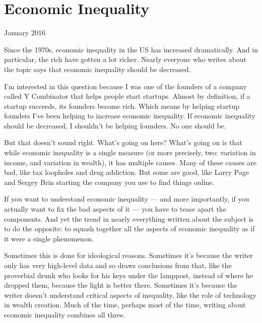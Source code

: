 \chapter{Economic Inequality}


            
              
                


                  January 2016

Since the 1970s, economic inequality
                  in the US has increased dramatically. And in particular, the
                  rich have gotten a lot richer. Nearly everyone who writes
                  about the topic says that economic inequality should be
                  decreased.

I'm interested in this question because
                  I was one of the founders of a company called Y Combinator
                  that helps people start startups. Almost by definition, if a
                  startup succeeds, its founders become rich. Which means by
                  helping startup founders I've been helping to increase
                  economic inequality. If economic inequality should be
                  decreased, I shouldn't be helping founders. No one should
                  be.

But that doesn't sound right. What's going on
                  here? What's going on is that while economic inequality is a
                  single measure (or more precisely, two: variation in income,
                  and variation in wealth), it has multiple causes. Many of
                  these causes are bad, like tax loopholes and drug addiction.
                  But some are good, like Larry Page and Sergey Brin starting
                  the company you use to find things online.

If you
                  want to understand economic inequality --- and more
                  importantly, if you actually want to fix the bad aspects of it
                  --- you have to tease apart the components. And yet the
                  trend in nearly everything written about the subject is to do
                  the opposite: to squash together all the aspects of economic
                  inequality as if it were a single phenomenon.

Sometimes
                  this is done for ideological reasons. Sometimes it's because
                  the writer only has very high-level data and so draws
                  conclusions from that, like the proverbial drunk who looks for
                  his keys under the lamppost, instead of where he dropped them,
                  because the light is better there. Sometimes it's because the
                  writer doesn't understand critical aspects of inequality, like
                  the role of technology in wealth creation. Much of the time,
                  perhaps most of the time, writing about economic inequality
                  combines all three.


